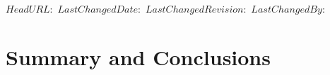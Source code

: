 \svnidlong
{$HeadURL:  $}
{$LastChangedDate:  $}
{$LastChangedRevision:  $}
{$LastChangedBy:  $}
\chapter[Summary and Conclusions]{Summary and
  Conclusions\versionfootnote}
\label{cha:conclusions}




